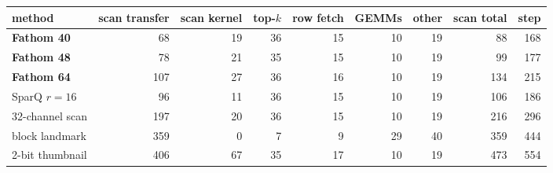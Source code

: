\begin{tabular}{lrrrrrrrr}
\toprule
method & scan transfer & scan kernel & top-$k$ & row fetch & GEMMs & other & scan total & step \\
\midrule
\textbf{Fathom 40} & 68 & 19 & 36 & 15 & 10 & 19 & 88 & 168 \\
\textbf{Fathom 48} & 78 & 21 & 35 & 15 & 10 & 19 & 99 & 177 \\
\textbf{Fathom 64} & 107 & 27 & 36 & 16 & 10 & 19 & 134 & 215 \\
SparQ $r{=}16$ & 96 & 11 & 36 & 15 & 10 & 19 & 106 & 186 \\
32-channel scan & 197 & 20 & 36 & 15 & 10 & 19 & 216 & 296 \\
block landmark & 359 & 0 & 7 & 9 & 29 & 40 & 359 & 444 \\
2-bit thumbnail & 406 & 67 & 35 & 17 & 10 & 19 & 473 & 554 \\
\bottomrule
\end{tabular}